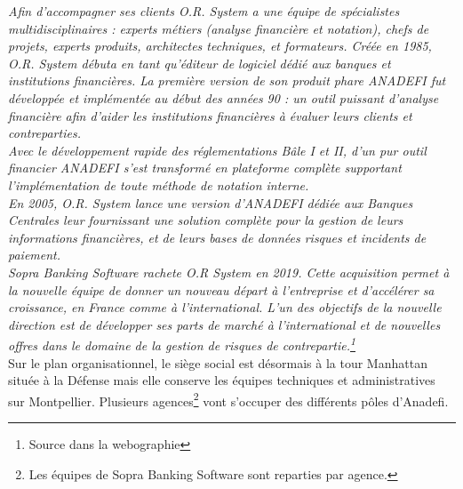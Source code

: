 \textit{Afin d’accompagner ses clients O.R. System a une équipe de spécialistes multidisciplinaires : experts métiers (analyse financière et notation), chefs de projets, experts produits, architectes techniques, et formateurs.
Créée en 1985, O.R. System débuta en tant qu’éditeur de logiciel dédié aux banques et institutions financières.
La première version de son produit phare ANADEFI fut développée et implémentée au début des années 90 : un outil puissant d’analyse financière afin d’aider les institutions financières à évaluer leurs clients et contreparties.}\\

\textit{Avec le développement rapide des réglementations Bâle I et II, d’un pur outil financier ANADEFI s’est transformé en plateforme complète supportant l’implémentation de toute méthode de notation interne.}\\

\textit{En 2005, O.R. System lance une version d’ANADEFI dédiée aux Banques Centrales leur fournissant une solution complète pour la gestion de leurs informations financières, et de leurs bases de données risques et incidents de paiement.}\\

\textit{Sopra Banking Software rachete O.R System en 2019.
Cette acquisition permet à la nouvelle équipe de donner un nouveau départ à l’entreprise et d’accélérer sa croissance, en France comme à l’international.
L’un des objectifs de la nouvelle direction est de développer ses parts de marché à l’international et de nouvelles offres dans le domaine de la gestion de risques de contrepartie.\footnote{Source dans la webographie}}\\

Sur le plan organisationnel, le siège social est désormais à la tour Manhattan située à la Défense mais elle conserve les équipes techniques et administratives sur Montpellier. Plusieurs agences\footnote{Les équipes de Sopra Banking Software sont reparties par agence.} vont s'occuper des différents pôles d'Anadefi.


